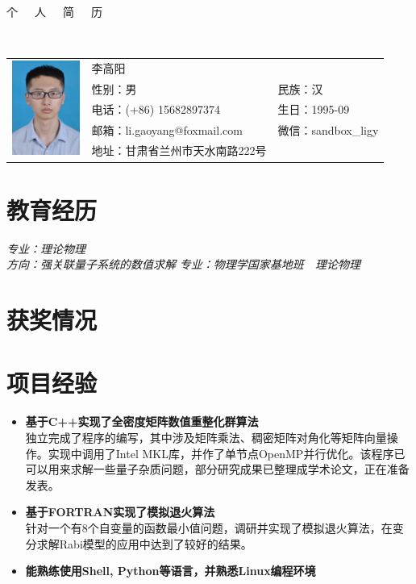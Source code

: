 \documentclass{resume}
\begin{document}

\begin{center}
\Huge{个~~~人~~~简~~~历}
\end{center}
\\
\Large{
  \begin{tabu}{ c l l }
    &
   \scshape{李高阳} &  \\
    & 性别：男 & 民族：汉 \\
    & 电话：(+86) 15682897374 & 生日：1995-09 \\
    & 邮箱：li.gaoyang@foxmail.com & 微信：sandbox\_ligy\\
    & 地址：甘肃省兰州市天水南路222号 \hspace{40} & %
  \end{tabu}
}

\section{教育经历}
\textit{专业：理论物理}\\
\textit{方向：强关联量子系统的数值求解}
\textit{专业：物理学国家基地班\ \ 理论物理}

\section{获奖情况}

\section{项目经验}
\begin{itemize}%
\item \textbf{基于C++实现了全密度矩阵数值重整化群算法}\\
独立完成了程序的编写，其中涉及矩阵乘法、稠密矩阵对角化等矩阵向量操作。实现中调用了Intel MKL库，并作了单节点OpenMP并行优化。该程序已可以用来求解一些量子杂质问题，部分研究成果已整理成学术论文，正在准备发表。
\item \textbf{基于FORTRAN实现了模拟退火算法}\\
针对一个有8个自变量的函数最小值问题，调研并实现了模拟退火算法，在变分求解Rabi模型的应用中达到了较好的结果。
\item \textbf{能熟练使用Shell, Python等语言，并熟悉Linux编程环境}
\end{itemize}
\end{document}
